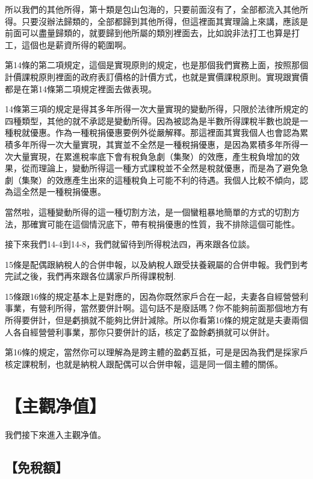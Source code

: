 \documentclass[]{ctexbook}
\begin{document}
所以我們的其他所得，第十類是包山包海的，只要前面沒有了，全部都流入其他所得。只要沒辦法歸類的，全部都歸到其他所得，但這裡面其實理論上來講，應該是前面可以盡量歸類的，就要歸到他所屬的類別裡面去，比如說非法打工也算是打工，這個也是薪資所得的範圍啊。

第14條的第二項規定，這個是實現原則的規定，也是那個我們實務上面，按照那個計價課稅原則裡面的政府表訂價格的計價方式，也就是實價課稅原則。實現跟實價都是在第14條第二項規定裡面去做表現。

14條第三項的規定是得其多年所得一次大量實現的變動所得，只限於法律所規定的四種類型，其他的就不承認是變動所得。因為被認為是半數所得課稅半數也說是一種稅就優惠。作為一種稅捐優惠要例外從嚴解釋。那這裡面其實我個人也會認為累積多年所得一次大量實現，其實並不全然是一種稅捐優惠，是因為累積多年所得一次大量實現，在累進稅率底下會有稅負急劇（集聚）的效應，產生稅負增加的效果，從而理論上，變動所得這一種方式課稅並不全然是稅就優惠，而是為了避免急劇（集聚）的效應產生出來的這種稅負上可能不利的待遇。我個人比較不傾向，認為這全然是一種稅捐優惠。

當然啦，這種變動所得的這一種切割方法，是一個蠻粗暴地簡單的方式的切割方法，那確實可能在這個情況底下，帶有稅捐優惠的性質，我不排除這個可能性。

接下來我們14-4到14-8，我們就留待到所得稅法四，再來跟各位談。

15條是配偶跟納稅人的合併申報，以及納稅人跟受扶養親屬的合併申報。我們到考完試之後，我們再來跟各位講家戶所得課稅制.

15條跟16條的規定基本上是對應的，因為你既然家戶合在一起，夫妻各自經營營利事業，有營利所得，當然要併計啊。這句話不是廢話嗎？你不能夠前面那個地方有所得要併計，但是虧損就不能夠比併計減除。所以你看第16條的規定就是夫妻兩個人各自經營營利事業，那你只要併計的話，核定了盈餘虧損就可以併計。

第16條的規定，當然你可以理解為是跨主體的盈虧互抵，可是是因為我們是採家戶核定課稅制，也就是納稅人跟配偶可以合併申報，這是同一個主體的關係。

\hypertarget{ux4e3bux89c0ux51c0ux503c}{%
\section{【主觀净值】}\label{ux4e3bux89c0ux51c0ux503c}}

我們接下來進入主觀净值。

\hypertarget{ux514dux7a05ux984d}{%
\subsection{【免稅額】}\label{ux514dux7a05ux984d}}
\end{document}
